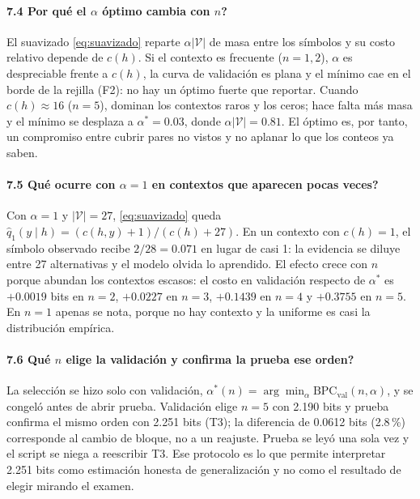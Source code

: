 \documentclass[11pt,letterpaper]{article}
\newcommand{\BPC}{\text{BPC}}
\newcommand{\Val}{\text{val}}
\begin{document}
\paragraph{7.4 \textquestiondown{}Por qué el $\alpha$ óptimo cambia con $n$?}
El suavizado \eqref{eq:suavizado} reparte $\alpha|\mathcal{V}|$ de masa entre los símbolos y su costo relativo depende de $c(h)$. Si el contexto es frecuente ($n=1,2$), $\alpha$ es despreciable frente a $c(h)$, la curva de validación es plana y el mínimo cae en el borde de la rejilla (F2): no hay un óptimo fuerte que reportar. Cuando $c(h)\approx16$ ($n=5$), dominan los contextos raros y los ceros; hace falta más masa y el mínimo se desplaza a $\alpha^*=0.03$, donde $\alpha|\mathcal{V}|=0.81$. El óptimo es, por tanto, un compromiso entre cubrir pares no vistos y no aplanar lo que los conteos ya saben.

\paragraph{7.5 \textquestiondown{}Qué ocurre con $\alpha=1$ en contextos que aparecen pocas veces?}
Con $\alpha=1$ y $|\mathcal{V}|=27$, \eqref{eq:suavizado} queda $\hat q_1(y\mid h)=(c(h,y)+1)/(c(h)+27)$. En un contexto con $c(h)=1$, el símbolo observado recibe $2/28=0.071$ en lugar de casi 1: la evidencia se diluye entre 27 alternativas y el modelo olvida lo aprendido. El efecto crece con $n$ porque abundan los contextos escasos: el costo en validación respecto de $\alpha^*$ es $+0.0019$ bits en $n=2$, $+0.0227$ en $n=3$, $+0.1439$ en $n=4$ y $+0.3755$ en $n=5$. En $n=1$ apenas se nota, porque no hay contexto y la uniforme es casi la distribución empírica.

\paragraph{7.6 \textquestiondown{}Qué $n$ elige la validación y confirma la prueba ese orden?}
La selección se hizo solo con validación, $\alpha^*(n)=\arg\min_\alpha\BPC_{\Val}(n,\alpha)$, y se congeló antes de abrir prueba. Validación elige $n=5$ con 2.190 bits y prueba confirma el mismo orden con 2.251 bits (T3); la diferencia de 0.0612 bits (2.8\,\%) corresponde al cambio de bloque, no a un reajuste. Prueba se leyó una sola vez y el script se niega a reescribir T3. Ese protocolo es lo que permite interpretar 2.251 bits como estimación honesta de generalización y no como el resultado de elegir mirando el examen.
\end{document}

